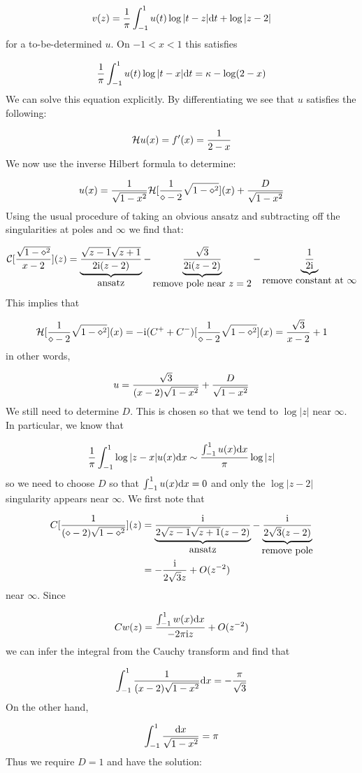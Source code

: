 \documentclass[12pt,a4paper]{article}
\def\D{ {\rm d} }
\def\I{ {\rm i} }
\def\CC{ {\cal C} }
\def\HH{ {\cal H} }
\def\dx{\D x}
\def\dt{\D t}
\begin{document}
\[
v(z) = {1 \over \pi} \int_{-1}^1 u(t) \log|t-z| \dt + \log|z-2|
\]
for a to-be-determined $u$. On $-1 < x < 1$ this satisfies

\[
 {1 \over \pi} \int_{-1}^1 u(t) \log|t-x| \dt  = \kappa - \log(2-x)
\]
We can solve this equation explicitly. By differentiating we see that $u$ satisfies the following:

\[
\HH u(x) = f'(x) = {1 \over 2-x}
\]
We now use the inverse Hilbert formula to determine:

\[
u(x) = {1\over\sqrt{1-x^2}} \HH [{1 \over \diamond-2} \sqrt{1-\diamond^2}](x) + {D \over \sqrt{1-x^2}}
\]
Using the usual procedure of taking an obvious ansatz and subtracting off the singularities at poles and $\infty$ we find that:

\[
\CC[{\sqrt{1-\diamond^2} \over x -2}](z) =
\underbrace{\sqrt{z-1} \sqrt{z+1} \over 2 \I (z-2)}_{\hbox{ansatz}} - \underbrace{\sqrt 3\over 2 \I (z-2)}_{\hbox{remove pole near $z=2$}} - \underbrace{{1 \over 2 \I}}_{\hbox{remove constant at $\infty$}}
\]
This implies that

\[
\HH[{1 \over\diamond-2} \sqrt{1-\diamond^2}](x) = -\I(C^+ + C^-)[{1 \over\diamond-2} \sqrt{1-\diamond^2}](x) = {\sqrt 3 \over x -2} + 1
\]
in other words,

\[
u = {\sqrt{3} \over (x - 2) \sqrt{1-x^2}} + {D \over \sqrt{1-x^2}}
\]
We still need to determine $D$. This is chosen so that we tend to $\log |z|$ near $\infty$. In particular, we know that

\[
{1 \over \pi} \int_{-1}^1 \log|z-x| u(x) \dx \sim  {\int_{-1}^1 u(x) \dx \over \pi}  \log |z|
\]
so we need to choose $D$ so that $\int_{-1}^1 u(x) \dx = 0$ and only the $\log|z-2|$ singularity appears near $\infty$. We first note that


\begin{align*}
C[{1 \over (\diamond - 2) \sqrt{1-\diamond^2}}](z) &= \underbrace{{\I \over 2 \sqrt{z-1} \sqrt{z+1} (z-2)}}_{\hbox{ansatz}} - \underbrace{{\I \over  2\sqrt{3} (z-2)}}_{\hbox{remove pole}} \\
& = -{\I \over 2 \sqrt{3} z} + O(z^{-2})
\end{align*}
near $\infty$. Since

\[
Cw(z)  ={ \int_{-1}^1 w(x) \dx \over -2\pi \I z} + O(z^{-2})
\]
we can  infer the integral from the Cauchy transform and find that

\[
\int_{-1}^1 {1 \over (x - 2) \sqrt{1-x^2}} \dx = -{ \pi \over \sqrt{3}}
\]
On the other hand,

\[
\int_{-1}^1 {\dx \over \sqrt{1-x^2}} = \pi
\]
Thus we require $D = 1$ and have the solution:
\end{document}
